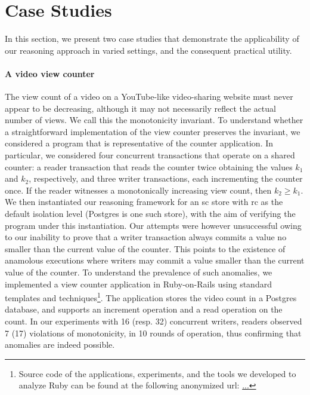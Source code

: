 \section{Case Studies}
\label{sec:case-studies}

In this section, we present two case studies that demonstrate the
applicability of our reasoning approach in varied settings, and the
consequent practical utility.

\paragraph{A video view counter} The view count of a video on a
YouTube-like video-sharing website must never appear to be decreasing,
although it may not necessarily reflect the actual number of views.
We call this the monotonicity invariant. To understand whether a
straightforward implementation of the view counter preserves the
invariant, we considered a \txnimp program that is representative of
the counter application. In particular, we considered four concurrent
transactions that operate on a shared counter: a reader transaction
that reads the counter twice obtaining the values $k_1$ and $k_2$,
respectively, and three writer transactions, each incrementing the
counter once. If the reader witnesses a monotonically increasing view
count, then $k_2\ge k_1$. We then instantiated our reasoning framework
for an {\sc sc} store with {\sc rc} as the default isolation level
(Postgres is one such store), with the aim of verifying the program
under this instantiation.  Our attempts were however unsuccessful
owing to our inability to prove that a writer transaction always
commits a value no smaller than the current value of the counter. This
points to the existence of anamolous executions where writers may
commit a value smaller than the current value of the counter. To
understand the prevalence of such anomalies, we implemented a view
counter application in Ruby-on-Rails using standard templates and
techniques\footnote{Source code of the applications, experiments, and
the tools we developed to analyze Ruby can be found at the following
anonymized url: \url{...}}. The application stores the video count in
a Postgres database, and supports an increment operation and a read
operation on the count. In our experiments with 16 (resp. 32)
concurrent writers, readers observed 7 (17) violations of
monotonicity, in 10 rounds of operation, thus confirming that
anomalies are indeed possible. 

